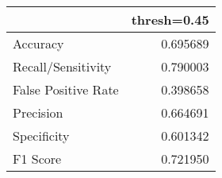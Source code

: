 \begin{tabu}{lr}
\toprule
 & thresh=0.45 \\
\midrule
Accuracy & 0.695689 \\
Recall/Sensitivity & 0.790003 \\
False Positive Rate & 0.398658 \\
Precision & 0.664691 \\
Specificity & 0.601342 \\
F1 Score & 0.721950 \\
\bottomrule
\end{tabu}
